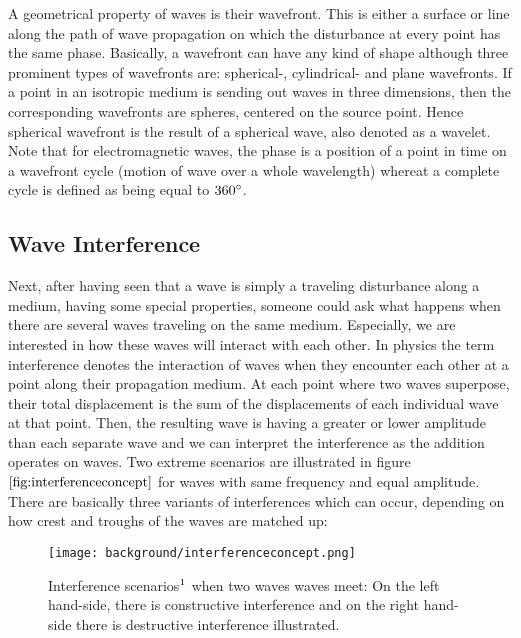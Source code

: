 A geometrical property of waves is their wavefront. This is either a surface or line along the path of wave propagation on which the disturbance at every point has the same phase. Basically, a wavefront can have any kind of shape although three prominent types of wavefronts are: spherical-, cylindrical- and plane wavefronts. If a point in an isotropic medium is sending out waves in three dimensions, then the corresponding wavefronts are spheres, centered on the source point. Hence spherical wavefront is the result of a spherical wave, also denoted as a wavelet. Note that for electromagnetic waves, the phase is a position of a point in time on a wavefront cycle (motion of wave over a whole wavelength) whereat a complete cycle is defined as being equal to $360\degree$.

\subsection{Wave Interference}
Next, after having seen that a wave is simply a traveling disturbance along a medium, having some special properties, someone could ask what happens when there are several waves traveling on the same medium. Especially, we are interested in how these waves will interact with each other. In physics the term interference denotes the interaction of waves when they encounter each other at a point along their propagation medium. At each point where two waves superpose, their total displacement is the sum of the displacements of each individual wave at that point. Then, the resulting wave is having a greater or lower amplitude than each separate wave and we can interpret the interference as the addition operates on waves. Two extreme scenarios are illustrated in figure $\ref{fig:interferenceconcept}$ for waves with same frequency and equal amplitude. There are basically three variants of interferences which can occur, depending on how crest and troughs of the waves are matched up:

\begin{figure}[H]
  \centering
  \texttt{[image: background/interferenceconcept.png]}
  \caption[interference]{Interference scenarios$\footnotemark$ when two waves waves meet: On the left hand-side, there is constructive interference and on the right hand-side there is destructive interference illustrated.}
  \label{fig:interferenceconcept}
\end{figure}

